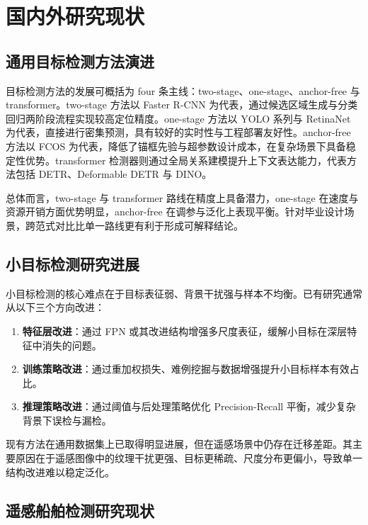 \chapter{国内外研究现状}
\label{ch:related_work}

\section{通用目标检测方法演进}

目标检测方法的发展可概括为 four 条主线：two-stage、one-stage、anchor-free 与 transformer。two-stage 方法以 Faster R-CNN 为代表，通过候选区域生成与分类回归两阶段流程实现较高定位精度\cite{ren2015_fasterrcnn}。one-stage 方法以 YOLO 系列与 RetinaNet 为代表，直接进行密集预测，具有较好的实时性与工程部署友好性\cite{redmon2016_yolo,redmon2018_yolov3,lin2017_focalloss}。anchor-free 方法以 FCOS 为代表，降低了锚框先验与超参数设计成本，在复杂场景下具备稳定性优势\cite{tian2019_fcos}。transformer 检测器则通过全局关系建模提升上下文表达能力，代表方法包括 DETR、Deformable DETR 与 DINO\cite{carion2020_detr,zhu2021_deformabledetr,zhang2023_dino}。

总体而言，two-stage 与 transformer 路线在精度上具备潜力，one-stage 在速度与资源开销方面优势明显，anchor-free 在调参与泛化上表现平衡。针对毕业设计场景，跨范式对比比单一路线更有利于形成可解释结论。

\section{小目标检测研究进展}

小目标检测的核心难点在于目标表征弱、背景干扰强与样本不均衡。已有研究通常从以下三个方向改进：

\begin{enumerate}
  \item \textbf{特征层改进}：通过 FPN 或其改进结构增强多尺度表征，缓解小目标在深层特征中消失的问题\cite{lin2017_fpn}。
  \item \textbf{训练策略改进}：通过重加权损失、难例挖掘与数据增强提升小目标样本有效占比\cite{lin2017_focalloss}。
  \item \textbf{推理策略改进}：通过阈值与后处理策略优化 Precision-Recall 平衡，减少复杂背景下误检与漏检。
\end{enumerate}

现有方法在通用数据集上已取得明显进展，但在遥感场景中仍存在迁移差距。其主要原因在于遥感图像中的纹理干扰更强、目标更稀疏、尺度分布更偏小，导致单一结构改进难以稳定泛化。

\section{遥感船舶检测研究现状}

